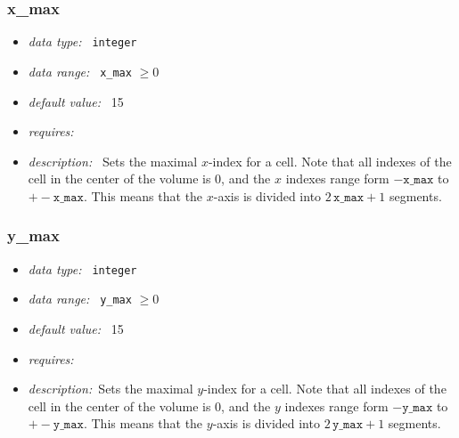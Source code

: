 \documentclass[a4paper,10pt]{article}
\begin{document}
\subsubsection{x\_max}
\label{opt:xmax}
\begin{itemize}
 \item \textit{data type:~} \texttt{integer}
 \item \textit{data range:~} \texttt{x\_max} $\ge0$
 \item \textit{default value:~} 15
 \item \textit{requires:~} 
 \item \textit{description:~} Sets the maximal $x$-index for a cell. Note that
  all indexes of the cell in the center of the volume is 0, and the  $x$ 
  indexes range form $-\mathtt{x\_max}$ to $+-\mathtt{x\_max}$. This means that 
  the $x$-axis is divided into $2\, \mathtt{x\_max} +1$ segments.
\end{itemize}

\subsubsection{y\_max}
\label{opt:ymax}
\begin{itemize}
 \item \textit{data type:~} \texttt{integer}
 \item \textit{data range:~} \texttt{y\_max} $\ge0$
 \item \textit{default value:~} 15
 \item \textit{requires:~}
 \item \textit{description:~}Sets the maximal $y$-index for a cell. Note that
  all indexes of the cell in the center of the volume is 0, and the  $y$ 
  indexes range form $-\mathtt{y\_max}$ to $+-\mathtt{y\_max}$. This means that 
  the $y$-axis is divided into $2\, \mathtt{y\_max} +1$ segments.
\end{itemize}
\end{document}
